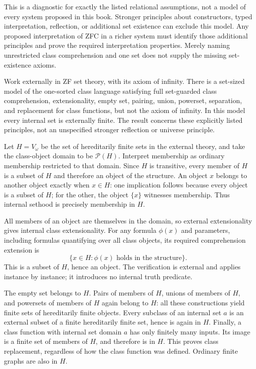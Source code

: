 This is a diagnostic for exactly the listed relational assumptions, not
a model of every system proposed in this book. Stronger principles about
constructors, typed interpretation, reflection, or additional set existence
can exclude this model. Any proposed interpretation of ZFC in a richer
system must identify those additional principles and prove the required
interpretation properties. Merely naming unrestricted class comprehension
and one set does not supply the missing set-existence axioms.

\begin{theorem}
Work externally in ZF set theory, with its axiom of infinity. There is a
set-sized model of the one-sorted class language satisfying full
set-guarded class comprehension, extensionality, empty set, pairing,
union, powerset, separation, and replacement for class functions, but
not the axiom of infinity. In this model every internal set is externally
finite. The result concerns these explicitly listed principles, not an
unspecified stronger reflection or universe principle.
\end{theorem}
\Proof
Let $H=V_\omega$ be the set of hereditarily finite sets in the external
theory, and take the class-object domain to be $\mathcal P(H)$.
Interpret membership as ordinary membership restricted to that domain.
Since $H$ is transitive, every member of $H$ is a subset of $H$ and
therefore an object of the structure. An object $x$ belongs to another
object exactly when $x\in H$: one implication follows because every
object is a subset of $H$; for the other, the object $\{x\}$ witnesses
membership. Thus internal sethood is precisely membership in $H$.

All members of an object are themselves in the domain, so external
extensionality gives internal class extensionality. For any formula
$\phi(x)$ and parameters, including formulas quantifying over all class
objects, its required comprehension extension is
\[
\{x\in H:\phi(x)\text{ holds in the structure}\}.
\]
This is a subset of $H$, hence an object. The verification is external
and applies instance by instance; it introduces no internal truth
predicate.

The empty set belongs to $H$. Pairs of members of $H$, unions of
members of $H$, and powersets of members of $H$ again belong to $H$:
all these constructions yield finite sets of hereditarily finite
objects. Every subclass of an internal set $a$ is an external subset
of a finite hereditarily finite set, hence is again in $H$. Finally,
a class function with internal set domain $a$ has only finitely many
inputs. Its image is a finite set of members of $H$, and therefore is
in $H$. This proves class replacement, regardless of how the class
function was defined. Ordinary finite graphs are also in $H$.

